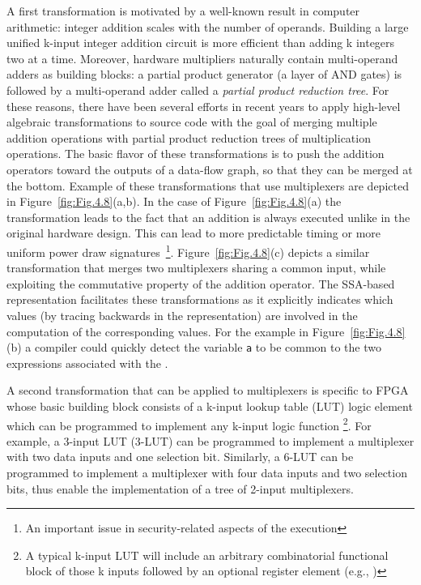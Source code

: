 A first transformation is motivated by a well-known result in computer arithmetic: 
integer addition scales with the number of operands. 
Building a large unified k-input integer addition circuit is more efficient than adding k integers two at a time. 
Moreover, hardware multipliers naturally contain multi-operand adders as building blocks: 
a partial product generator (a layer of AND gates) is followed by a multi-operand adder called a {\em partial product reduction tree}. 
For these reasons, there have been several efforts in recent years to apply high-level algebraic transformations to source code with the goal of merging multiple addition operations with partial product reduction trees of multiplication operations. 
The basic flavor of these transformations is to push the addition operators toward the outputs of a data-flow graph, so that they can be merged at the bottom. 
Example of these transformations that use multiplexers are depicted in Figure~\ref{fig:Fig.4.8}(a,b). 
In the case of Figure~\ref{fig:Fig.4.8}(a) the transformation leads to the fact that an addition is always executed unlike in the original hardware design. This can lead to more predictable timing or more uniform power draw signatures~\footnote{An important issue in security-related aspects of the execution}.
Figure~\ref{fig:Fig.4.8}(c) depicts a similar transformation that merges two multiplexers sharing a common input, while exploiting the commutative property of the addition operator. 
The SSA-based representation facilitates these transformations as it explicitly indicates which values (by tracing backwards in the representation) are involved in the computation of the corresponding values. 
For the example in Figure~\ref{fig:Fig.4.8}(b) a compiler could quickly detect the variable {\tt a} to be common  to the two expressions associated with the \phifun.

A second transformation that can be applied to multiplexers is specific to FPGA whose basic building block consists of a k-input lookup table (LUT) logic element which can be programmed to implement any k-input logic function \footnote{A typical k-input LUT will include an arbitrary combinatorial functional block of those k inputs followed by an optional register element (e.g.,  )}.
For example, a 3-input LUT (3-LUT) can be programmed to implement a multiplexer with two data inputs and one selection bit.  Similarly, a 6-LUT can be programmed to implement a multiplexer with four data inputs and two selection bits, thus enable the implementation of a tree of 2-input multiplexers.\\

